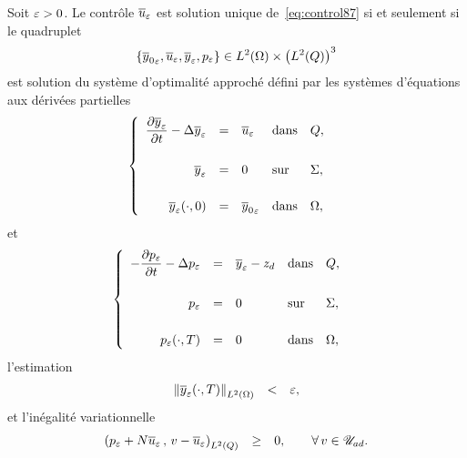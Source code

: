 \begin{theoreme}\label{thm:soapproche}%
    Soit $\varepsilon > 0$. Le contrôle ${\overline{u}}_{\varepsilon}$ est solution unique
    de~\eqref{eq:control87} si et seulement si le quadruplet
    \begin{equation*}
        \left\{{%
            {\bar{y}_{0}}_{\veps}, \bareps{u}, \bareps{y}, p_{\veps}
        }\right\}\in \Ldeux{\Omega}\times {\left({\Ldeux{Q}}\right)}^{3}
    \end{equation*}
    est solution du système d'optimalité approché défini par les systèmes
    d'équations aux dérivées partielles
    \begin{equation}
        \begin{cases}\displaystyle
            \begin{array}{rclll}
                \dfrac{\partial{}{\overline{y}}_{\varepsilon}}{\partial{}t} - \Delta{\overline{y}}_{\varepsilon} & = & {\overline{u}}_{\varepsilon}
                & \text{dans} & Q,\\
                \\
                {\overline{y}}_{\varepsilon} & = & 0 & \text{sur} & \Sigma,\\
                \\
                {{\overline{y}}_{\varepsilon}}\!\left({\cdot, 0}\right) & = & {\overline{y}_{0}}_{\varepsilon} &
                \text{dans} & \Omega,
            \end{array}
        \end{cases}
    \end{equation}
    et
    \begin{equation}\label{eq:control130}
        \begin{cases}\displaystyle
            \begin{array}{rclll}
                -\dfrac{\partial{}p_{\varepsilon}}{\partial{}t} - \Delta p_{\varepsilon} & = & {\overline{y}}_{\varepsilon}
                - z_{d} & \text{dans} & Q,\\
                \\
                p_{\varepsilon} & = & 0 & \text{sur} & \Sigma,\\
                \\
                {p_{\varepsilon}}\!\left({\cdot,T}\right) & = & 0 & \text{dans} & \Omega,
            \end{array}
        \end{cases}
    \end{equation}
    l'estimation
    \begin{equation}
        \begin{array}{rcl}
            \normeohm{%
                \condfinale{\bareps{y}}
            } & < & \veps,
        \end{array}
    \end{equation}
    et l'inégalité variationnelle
    \begin{equation}
        \begin{array}{rcl}
            \scalaireq{%
                p_{\veps} + N\bareps{u}
            }{%
                v - \bareps{u}
            } & \geq & 0,\qquad \forall\,v\in\uad.
        \end{array}
    \end{equation}
\end{theoreme}

